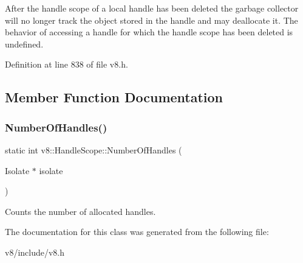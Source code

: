 After the handle scope of a local handle has been deleted the garbage collector will no longer track the object stored in the handle and may deallocate it. The behavior of accessing a handle for which the handle scope has been deleted is undefined. 

Definition at line 838 of file v8.\+h.



\subsection{Member Function Documentation}
\mbox{\label{classv8_1_1HandleScope_abab7214c9b9388b02f575fd5270b7e2f}} 
\subsubsection{\texorpdfstring{Number\+Of\+Handles()}{NumberOfHandles()}}
{\footnotesize\ttfamily static int v8\+::\+Handle\+Scope\+::\+Number\+Of\+Handles (\begin{DoxyParamCaption}\item[{Isolate $\ast$}]{isolate }\end{DoxyParamCaption})\hspace{0.3cm}{\ttfamily [static]}}

Counts the number of allocated handles. 

The documentation for this class was generated from the following file\+:\begin{DoxyCompactItemize}
\item 
v8/include/v8.\+h\end{DoxyCompactItemize}
